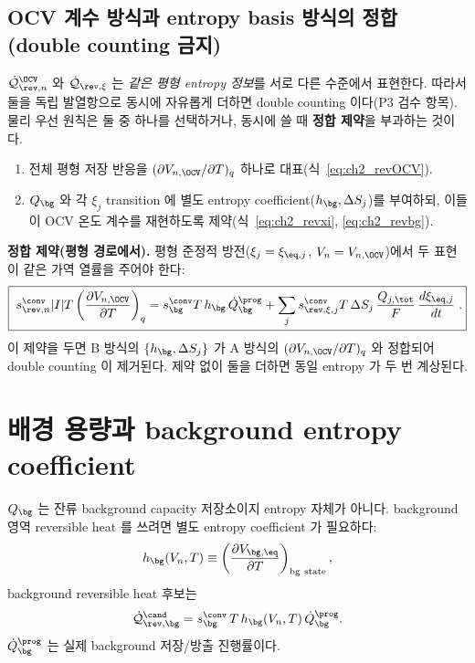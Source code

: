 \subsection{OCV 계수 방식과 entropy basis 방식의 정합 (double counting 금지)}\label{sec:ch2_double}
$\dot{\mathcal Q}_{\rev,n}^{\OCV}$ 와 $\dot{\mathcal Q}_{\rev,\xi}$ 는 \emph{같은 평형 entropy 정보}를 서로 다른
수준에서 표현한다. 따라서 둘을 독립 발열항으로 동시에 자유롭게 더하면 double counting 이다(P3 검수 항목).
물리 우선 원칙은 둘 중 하나를 선택하거나, 동시에 쓸 때 \textbf{정합 제약}을 부과하는 것이다.
\begin{enumerate}[label=\Alph*),leftmargin=2.0em]
\item 전체 평형 저장 반응을 $(\partial V_{n,\OCV}/\partial T)_q$ 하나로 대표(식~\eqref{eq:ch2_revOCV}).
\item $Q_\bg$ 와 각 $\xi_j$ transition 에 별도 entropy coefficient($h_\bg,\Delta S_j$)를 부여하되, 이들이
  OCV 온도 계수를 재현하도록 제약(식~\eqref{eq:ch2_revxi}, \eqref{eq:ch2_revbg}).
\end{enumerate}
\textbf{정합 제약(평형 경로에서).} 평형 준정적 방전($\xi_j=\xi_{\eq,j}$, $V_n=V_{n,\OCV}$)에서 두 표현이 같은
가역 열률을 주어야 한다:
\begin{equation}
\boxed{\;s_{\rev,n}^{\conv}|I|T\left(\frac{\partial V_{n,\OCV}}{\partial T}\right)_q
=s_\bg^{\conv}T\,h_\bg\,\dot Q_\bg^{\prog}
+\sum_{j}s_{\rev,\xi,j}^{\conv}T\,\Delta S_j\,\frac{Q_{j,\tot}}{F}\,\frac{d\xi_{\eq,j}}{dt}\;.}
\label{eq:ch2_consistency}
\end{equation}
이 제약을 두면 B 방식의 $\{h_\bg,\Delta S_j\}$ 가 A 방식의 $(\partial V_{n,\OCV}/\partial T)_q$ 와 정합되어
double counting 이 제거된다. 제약 없이 둘을 더하면 동일 entropy 가 두 번 계상된다.

\section{배경 용량과 background entropy coefficient}\label{sec:ch2_bg}
$Q_\bg$ 는 잔류 background capacity 저장소이지 entropy 자체가 아니다. background 영역 reversible heat 를
쓰려면 별도 entropy coefficient 가 필요하다:
\begin{equation}
h_\bg(V_n,T)\equiv\left(\frac{\partial V_{\bg,\eq}}{\partial T}\right)_{\mathrm{bg\ state}},
\label{eq:ch2_hbg}
\end{equation}
background reversible heat 후보는
\begin{equation}
\dot{\mathcal Q}_{\rev,\bg}^{\cand}=s_\bg^{\conv}\,T\,h_\bg(V_n,T)\,\dot Q_\bg^{\prog}.
\label{eq:ch2_revbg}
\end{equation}
$\dot Q_\bg^{\prog}$ 는 실제 background 저장/방출 진행률이다.

